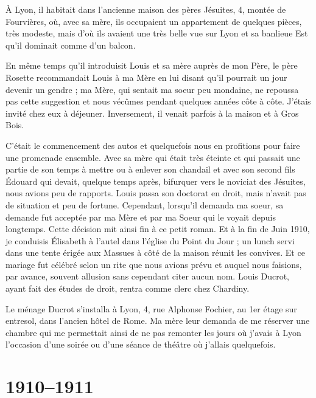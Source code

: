 \documentclass[11pt,a4paper]{report}
\begin{document}
À Lyon, il habitait dans l'ancienne maison des pères Jésuites, 4, montée de Fourvières, où, avec sa mère, ils occupaient un appartement de quelques pièces, très modeste, mais d'où ils avaient une très belle vue sur Lyon et sa banlieue Est qu'il dominait comme d'un balcon.

En même temps qu'il introduisit Louis et sa mère auprès de mon Père, le père Rosette recommandait Louis à ma Mère en lui disant qu'il pourrait un jour devenir un gendre ; ma Mère, qui sentait ma soeur peu mondaine, ne repoussa pas cette suggestion et nous vécûmes pendant quelques années côte à côte. J'étais invité chez eux à déjeuner. Inversement, il venait parfois à la maison et à Gros Bois.

C'était le commencement des autos et quelquefois nous en profitions pour faire une promenade ensemble. Avec sa mère qui était très éteinte et qui passait une partie de son temps à mettre ou à enlever son chandail et avec son second fils Édouard qui devait, quelque temps après, bifurquer vers le noviciat des Jésuites, nous avions peu de rapports. Louis passa son doctorat en droit, mais n'avait pas de situation et peu de fortune. Cependant, lorsqu'il demanda ma soeur, sa demande fut acceptée par ma Mère et par ma Soeur qui le voyait depuis longtemps. Cette décision mit ainsi fin à ce petit roman. Et à la fin de Juin 1910, je conduisis Élisabeth à l'autel dans l'église du Point du Jour ; un lunch servi dans une tente érigée aux Massues à côté de la maison réunit les convives. Et ce mariage fut célébré selon un rite que nous avions prévu et auquel nous faisions, par avance, souvent allusion sans cependant citer aucun nom. Louis Ducrot, ayant fait des études de droit, rentra comme clerc chez Chardiny.

Le ménage Ducrot s'installa à Lyon, 4, rue Alphonse Fochier, au 1er étage sur entresol, dans l'ancien hôtel de Rome. Ma mère leur demanda de me réserver une chambre qui me permettait ainsi de ne pas remonter les jours où j'avais à Lyon l'occasion d'une soirée ou d'une séance de théâtre où j'allais quelquefois.

\chapter{1910--1911}
\end{document}
